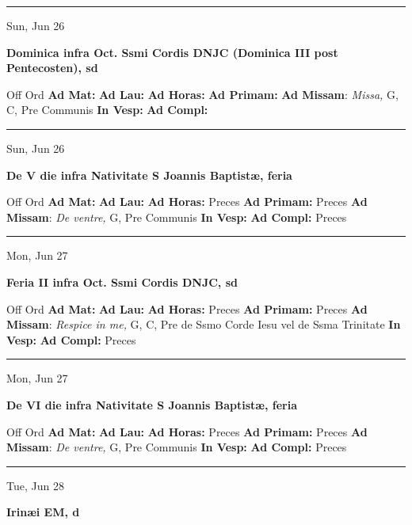 \documentclass[letterpaper, 10pt]{article}
\begin{document}
\hrule
\begin{center}
Sun, Jun 26
\end{center}\textbf{ \large Dominica infra Oct. Ssmi Cordis DNJC (Dominica III post Pentecosten), \textnormal{\normalsize sd}}
\begin{justify}
Off Ord
\textbf{Ad Mat: }
\textbf{Ad Lau: }
\textbf{Ad Horas: }
\textbf{Ad Primam: }
\textbf{Ad Missam}: \textit{Missa,} G, C, Pre Communis
\textbf{In Vesp: }
\textbf{Ad Compl: }\end{justify}



\hrule
\begin{center}
Sun, Jun 26
\end{center}\textbf{ \large De V die infra Nativitate S Joannis Baptistæ, \textnormal{\normalsize feria}}
\begin{justify}
Off Ord
\textbf{Ad Mat: }
\textbf{Ad Lau: }
\textbf{Ad Horas: }Preces
\textbf{Ad Primam: }Preces
\textbf{Ad Missam}: \textit{De ventre,} G, Pre Communis
\textbf{In Vesp: }
\textbf{Ad Compl: }Preces\end{justify}



\hrule
\begin{center}
Mon, Jun 27
\end{center}\textbf{ \large Feria II infra Oct. Ssmi Cordis DNJC, \textnormal{\normalsize sd}}
\begin{justify}
Off Ord
\textbf{Ad Mat: }
\textbf{Ad Lau: }
\textbf{Ad Horas: }Preces
\textbf{Ad Primam: }Preces
\textbf{Ad Missam}: \textit{Respice in me,} G, C, Pre de Ssmo Corde Iesu vel de Ssma Trinitate
\textbf{In Vesp: }
\textbf{Ad Compl: }Preces\end{justify}



\hrule
\begin{center}
Mon, Jun 27
\end{center}\textbf{ \large De VI die infra Nativitate S Joannis Baptistæ, \textnormal{\normalsize feria}}
\begin{justify}
Off Ord
\textbf{Ad Mat: }
\textbf{Ad Lau: }
\textbf{Ad Horas: }Preces
\textbf{Ad Primam: }Preces
\textbf{Ad Missam}: \textit{De ventre,} G, Pre Communis
\textbf{In Vesp: }
\textbf{Ad Compl: }Preces\end{justify}



\hrule
\begin{center}
Tue, Jun 28
\end{center}\textbf{ \large Irinæi EM, \textnormal{\normalsize d}}
\end{document}
